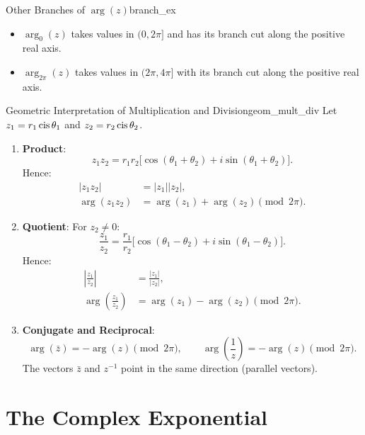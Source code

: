\begin{example}{Other Branches of $\arg(z)$}{branch_ex}
\begin{itemize}
    \item $\arg_0(z)$ takes values in $(0, 2\pi]$ and has its branch cut along the positive real axis.
    \item $\arg_{2\pi}(z)$ takes values in $(2\pi, 4\pi]$ with its branch cut along the positive real axis.
\end{itemize}
\end{example}

\begin{proposition}{Geometric Interpretation of Multiplication and Division}{geom_mult_div}
Let $z_1 = r_1 \operatorname{cis}\theta_1$ and $z_2 = r_2 \operatorname{cis}\theta_2$.
\begin{enumerate}
    \item \textbf{Product}:
    \begin{equation}
    z_1 z_2 = r_1 r_2 \big[\cos(\theta_1 + \theta_2) + i \sin(\theta_1 + \theta_2)\big].
    \end{equation}
    Hence:
    \begin{align}
    |z_1 z_2| &= |z_1| |z_2|, \\
    \arg(z_1 z_2) &= \arg(z_1) + \arg(z_2) \pmod{2\pi}.
    \end{align}
    \item \textbf{Quotient}: For $z_2 \neq 0$:
    \begin{equation}
    \frac{z_1}{z_2} = \frac{r_1}{r_2} \big[\cos(\theta_1 - \theta_2) + i \sin(\theta_1 - \theta_2)\big].
    \end{equation}
    Hence:
    \begin{align}
    \left|\frac{z_1}{z_2}\right| &= \frac{|z_1|}{|z_2|}, \\
    \arg\left(\frac{z_1}{z_2}\right) &= \arg(z_1) - \arg(z_2) \pmod{2\pi}.
    \end{align}
    \item \textbf{Conjugate and Reciprocal}:
    \begin{equation}
    \arg(\bar{z}) = -\arg(z) \pmod{2\pi}, \qquad \arg\left(\frac{1}{z}\right) = -\arg(z) \pmod{2\pi}.
    \end{equation}
    The vectors $\bar{z}$ and $z^{-1}$ point in the same direction (parallel vectors).
\end{enumerate}
\end{proposition}


\section{The Complex Exponential}

